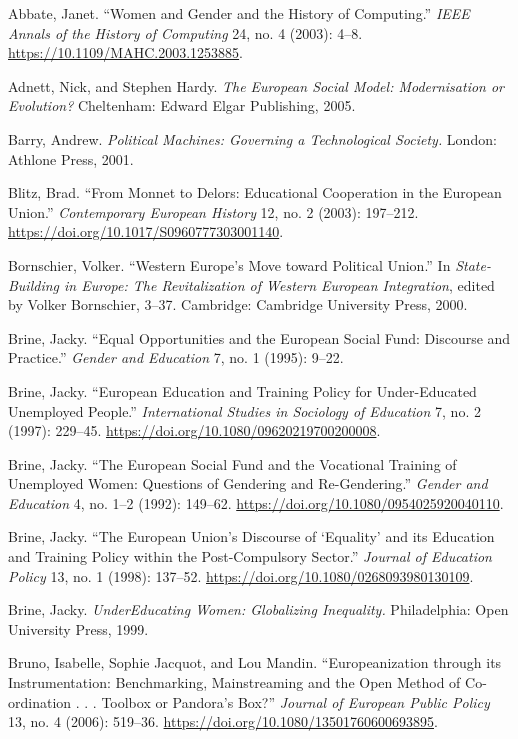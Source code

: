 \documentclass{tufte-handout}
\begin{document}
\begin{hangparas}{.25in}{1} 



Abbate, Janet. ``Women and Gender and the History of Computing.''
\emph{IEEE Annals of the History of Computing} 24, no. 4 (2003): 4--8.
\href{https://10.0.4.85/MAHC.2003.1253885}{https://10.1109/MAHC.2003.1253885}.

Adnett, Nick, and Stephen Hardy. \emph{The European Social Model:
Modernisation or Evolution?} Cheltenham: Edward Elgar Publishing, 2005.

Barry, Andrew. \emph{Political Machines: Governing a Technological
Society.} London: Athlone Press, 2001.

Blitz, Brad. ``From Monnet to Delors: Educational Cooperation in the
European Union.'' \emph{Contemporary European History} 12, no. 2 (2003):
197--212. \url{https://doi.org/10.1017/S0960777303001140}.

Bornschier, Volker. ``Western Europe's Move toward Political Union.'' In
\emph{State-Building in Europe: The Revitalization of Western European
Integration}, edited by Volker Bornschier, 3--37. Cambridge: Cambridge
University Press, 2000.

Brine, Jacky. ``Equal Opportunities and the European Social Fund:
Discourse and Practice.'' \emph{Gender and Education} 7, no. 1 (1995):
9--22.

Brine, Jacky. ``European Education and Training Policy for
Under-Educated Unemployed People.'' \emph{International Studies in
Sociology of Education} 7, no. 2 (1997): 229--45.
\url{https://doi.org/10.1080/09620219700200008}.

Brine, Jacky. ``The European Social Fund and the Vocational Training of
Unemployed Women: Questions of Gendering and Re-Gendering.''
\emph{Gender and Education} 4, no. 1--2 (1992): 149--62.
\url{https://doi.org/10.1080/0954025920040110}.

Brine, Jacky. ``The European Union's Discourse of `Equality' and its
Education and Training Policy within the Post-Compulsory Sector.''
\emph{Journal of Education Policy} 13, no. 1 (1998): 137--52.
\url{https://doi.org/10.1080/0268093980130109}.

Brine, Jacky. \emph{UnderEducating Women: Globalizing Inequality.}
Philadelphia: Open University Press, 1999.

Bruno, Isabelle, Sophie Jacquot, and Lou Mandin. ``Europeanization
through its Instrumentation: Benchmarking, Mainstreaming and the Open
Method of Co-ordination . . . Toolbox or Pandora's Box?'' \emph{Journal
of European Public Policy} 13, no. 4 (2006): 519--36.
\url{https://doi.org/10.1080/13501760600693895}.


\end{hangparas}
\end{document}
